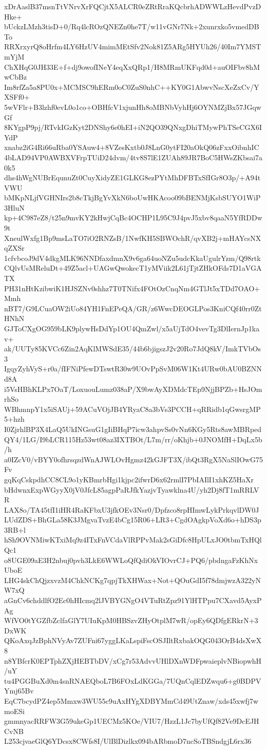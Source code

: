 xDrAaslB37msnTtVNrvXrFQCjtX5ALCR0eZRtRraKQcbrhADWWLzHevdPvzDHke+
bUckzLMzh3tisD+0/Rq4lcROzQNEZn0he7T/w11vGNr7Nk+2xunrxko5vmedDBTo
RRXrxyrQ8oHrfm4LY6HzUV4mimMEtSfv2Nok81Z5ARg5HYUh26/40Im7YMSTmYjM
ChXHqG0JH33E+f+dj9owofINeY4eqXxQRp1/H8MRmUKFqd0d+auOIFbv8hMwCbBz
Im8rfZa5a8PU0x+MCMSC9hERm0oC0ZuS0nhC++KY0G1AbwvNscXeZxCv/YXSFf0+
5wVFlr+B3lzhf0evL0o1co+OBHfcV1xjunHh8oMBNbVyhHj6OYNMZjBx57JGqwGf
8KYgpP9pj/RTvkIGzKyt2DNShy6e0hEI+iN2QO39QNxgDhiTMywPhTSeCGX6IYdP
xnabz2iG4Ri66uRba0YSAuw4+8VZesKxtb0J8LnG0ytFI20aOkQ06zFxxOibnhIC
4bLAD94VP0AWBXVFrpTUiD24dvm/4tv8S7lE1ZUAh89JR7BoC5HWsZKbsai7a0k5
dhs4hWgNUBrEqunuZt0CuyXidyZE1GLKG8ezPYtMhDFBTxSfIGr8O3p/+A94tVWU
bMKpNLjfVGHNIrs2b8cTkjBgYvXkN6boUwHKAcoo09bBENMjKsbSUYO1WiP3HluN
kp+4C987eZ8/t25n9mvKY2kHwjCqBc4OCHP1L95C9J4pvJ5xbv8qaaN5YfRDDw9t
XneulWxfg1Bp9msLaTO7iO2RNZsB/1NwfKH5SBWOchR/qvXB2j+mHAYcsNXqZXSr
1cfvbcoJ9dV4dkgMLK96NNDfaxdmnX9v6ga64uoNZu5udcKkaUgulrYzm/Q98rtk
CQlvUsMReluDt+49Z5acl+UAGwQwokecT1yMViik2L61jTjtZHkOFds7D1aVGATX
PH31nHtKzibwiK1HJSZNv0shhz7T0TNifx4FOtOzCnqNm4GTlJt5xTDd7OAO+Mmh
nBT7/G9LCuaOW2iUo84YH1FnEPeQA/GR/z6WwcDEOGLPos3KniCQf40rr0ZtHNhN
GJToCXgOG959bLK9plywHsDdYp1OU4QmZwl/x5aUjTdO4vevTg3DlIernJp1kav+
ak/UUTy85KVCc6Zin2AqKlMWSdE35/44b6bjigszJ2v20Ro7JdQ8kV/ImkTVbOs3
IgqyZyhVyS+r0a/fIFNiPfewDTswtR30w9UOvPpSvM06W1Kt4URw0bAU0BZNNd8A
i5VsHBhKLPx7OaT/LoxuouLumz038aP/X9bwAyXDMdcTEp9NjjBPZb+HsJOmrhSo
WBhmnpY1x5iSAUj+59ACuVOjJB4YRyaC8a3bVs3PCCH+qRRidb1qGwsrgMP5+hzh
I0ZjrhlBP3X4LaQ5UkINGsuG1gIiBHqP7icw3ahpvSs0vNn6KGy5Rts8awMBRped
QY4/1LG/I9bLCR115Hz53wt08az3IXTBOt/L7m/rr/oKhjb+0JNOMfH+DqLx5b/h
a0IZcV0/vBYY0ofhrsqzdWnAJWLOvHgmz42kGJFT3X/ibQt3RgX5NaSlIOwG75Fv
gqKqCskpdhCC8CL9o1yKBmrbHgi1kjpc2ifwrD6x62rmlI7PbIAIlI1xhKZ5HaXr
bHdwnxExpWGyyX0jV0JfcL85agpPaRJfkYazjvTyawklna4U/yh2Dj8fT1mRRLVR
LAX8o/TA45tfI1iHR4RaKFbxU3jfkOEv3Nsr0/Dpfzco8rpHImwLykPrkqvlDW0J
LUdZDS+BhGLa58K3JMgvaTvzE4bCg15R06+LR3+CgdOAgkpVoXd6o+hDS3p3RB+l
hSh9OVNMiwKTxiMq9z4ITxFnVCdaVlRPPvMak2sGiDfc8HpULxJO0tbmTxHQlQc1
o8UGE09aE3H2nbuj0pvh3LkE6WWLoQfQdiOkVIOvrCJ+PQ6/pbdngaFzKhNxUboE
LHG4skChQjzxvzM4ChkNCKg7qpjTkXHWax+Not+QOuGdI5f78dmjwzA322yNW7xQ
aGnCv6chddlfO2Ec0hHIcmq2lJVBYGNgO4VTuRtZpz91YlHTPpu7CXavd5AyxPAg
WfVO0tYGZfbZclfaGlY7UIuKpM0HBSzvZHyOtplM7wR/opEy6QDfgERkrN+3DxWK
QKoAxqJzBphNVyAv7ZUFni67yggLKaLspiFscOSJIltRxbakOQG043OrB4dsXwX8
n8YBfcrK0EPTphZXjHEBTbDV/xCg7r53AdvvUHlDXnWDFpwaieplvNBiopwhH/uY
tu4PGGBuXd0m4snRNAEQboL7B6FOxLdKGGa/7UQnCqlEDZwqu6+g0BDPVYmj65Bv
EqC7bcydPZ4ep5Mmxw3WU55c9uAxHYgXDBYMmCd49UtZnaw/xds45xwfj7wmoESi
gmmnyacRRFW3G59ukeGp1UECMz5KOe/VIU7/HzzL1Jc7byUfQf82Ve9DcEJHCvNB
L253cjvaeGlQ6YDcsx8CWfs8I/UlBlDizlkx094bARbmoD7ncSoTBSndgjL6rx36
